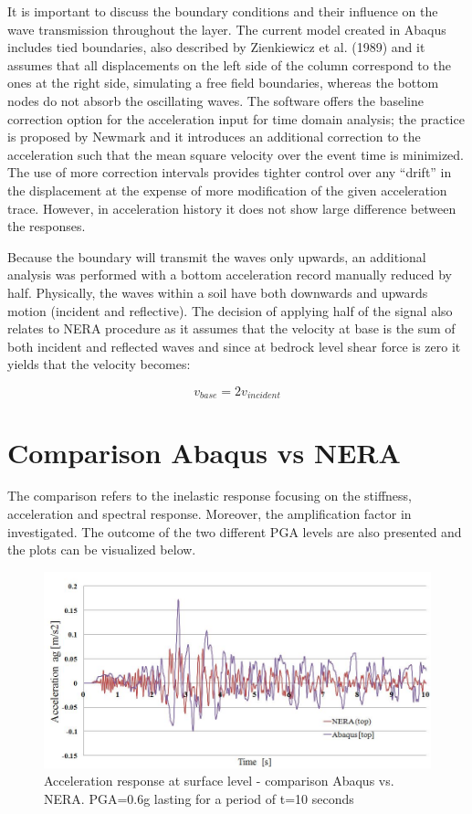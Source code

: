 	It is important to discuss the boundary conditions and their influence on the wave transmission throughout the layer. The current model created in Abaqus includes tied boundaries, also described by Zienkiewicz et al. (1989) \cite{zienkiewicz1989earthquake} and it assumes that all displacements on the left side of the column correspond to the ones at the right side, simulating a free field boundaries, whereas the bottom nodes do not absorb the oscillating waves. The software offers the baseline correction option for the acceleration input for time domain analysis; the practice is proposed by Newmark \cite{newmark1959method} and it introduces an additional correction to the acceleration such that the mean square velocity over the event time is minimized. The use of more correction intervals provides tighter control over any “drift” in the displacement at the expense of more modification of the given acceleration trace. However, in acceleration history it does not show large difference between the responses.
	
	Because the boundary will transmit the waves only upwards, an additional analysis was performed with a bottom acceleration record manually reduced by half. Physically, the waves within a soil have both downwards and upwards motion (incident and reflective). The decision of applying half of the signal also relates to NERA procedure as it assumes that the velocity at base is the sum of both incident and reflected waves and since at bedrock level shear force is zero it yields that the velocity becomes:
	
	\begin{equation}
	v_{base}=2v_{incident}
	\end{equation} 
	
	\newpage
	\section{Comparison Abaqus vs NERA}
	The comparison refers to the inelastic response focusing on the stiffness, acceleration and spectral response. Moreover, the amplification factor in investigated. The outcome of the two different PGA levels are also presented and the plots can be visualized below. 
	
	\begin{figure}[h!]
		\centering
		\includegraphics[width=0.7\linewidth]{"acc_comp1"}
		\caption{Acceleration response at surface level - comparison Abaqus vs. NERA. PGA=0.6g lasting for a period of t=10 seconds}
		\label{comp1}
	\end{figure}
	
